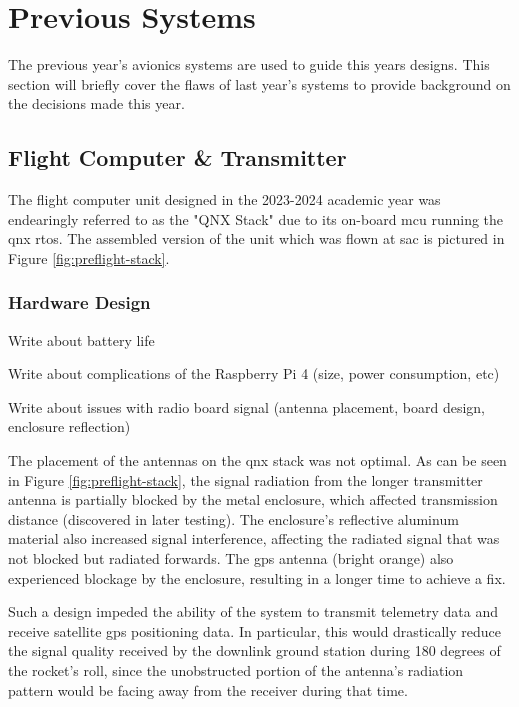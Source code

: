 \section{Previous Systems}

The previous year's avionics systems are used to guide this years designs. This section will briefly cover the flaws of
last year's systems to provide background on the decisions made this year.

\subsection{Flight Computer \& Transmitter}

The flight computer unit designed in the 2023-2024 academic year was endearingly referred to as the "QNX Stack" due to
its on-board \gls{mcu} running the \gls{qnx} \gls{rtos}. The assembled version of the unit which was flown at \gls{sac}
is pictured in Figure \ref{fig:preflight-stack}.

\subsubsection{Hardware Design}

Write about battery life

Write about complications of the Raspberry Pi 4 (size, power consumption, etc)

Write about issues with radio board signal (antenna placement, board design, enclosure reflection)

The placement of the antennas on the \gls{qnx} stack was not optimal. As can be seen in Figure
\ref{fig:preflight-stack}, the signal radiation from the longer transmitter antenna is partially blocked by the metal
enclosure, which affected transmission distance (discovered in later testing). The enclosure's reflective aluminum
material also increased signal interference, affecting the radiated signal that was not blocked but radiated forwards.
The \gls{gps} antenna (bright orange) also experienced blockage by the enclosure, resulting in a longer time to achieve
a fix.

Such a design impeded the ability of the system to transmit telemetry data and receive satellite \gls{gps} positioning
data. In particular, this would drastically reduce the signal quality received by the downlink ground station during
180 degrees of the rocket's roll, since the unobstructed portion of the antenna's radiation pattern would be facing
away from the receiver during that time.

